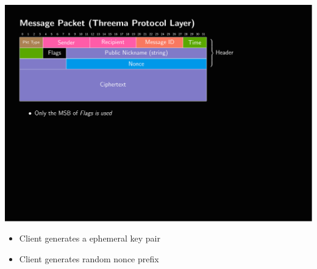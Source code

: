 \documentclass[
	aspectratio=169,
	xetex,
]{beamer}
\newcounter{i}
\begin{document}
\begin{frame}[t]
\begin{overlayarea}{\textwidth}{\textheight}
\begin{columns}
\begin{column}[t]{.69\textwidth}
\begin{overlayarea}{\textwidth}{\textheight}
{						\includegraphics[page=11,clip,trim={.99cm 9cm 3.2cm 2.55cm},width=\textwidth]{out/messages.pdf}
						\begin{itemize}
							\item Client generates a \alert{ephemeral key} pair
							\item Client generates random nonce prefix
						\end{itemize}
					}	
\end{overlayarea}
\end{column}
\end{columns}
\end{overlayarea}
\end{frame}
\end{document}
